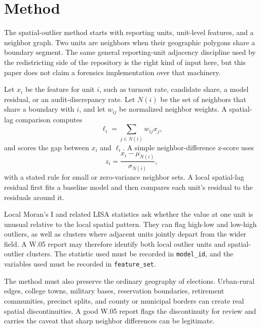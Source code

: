 \section{Method}

The spatial-outlier method starts with reporting units, unit-level features, and
a neighbor graph. Two units are neighbors when their geographic polygons share a
boundary segment. The same general reporting-unit adjacency discipline used by
the redistricting side of the repository is the right kind of input here, but
this paper does not claim a forensics implementation over that machinery.

Let $x_i$ be the feature for unit $i$, such as turnout rate, candidate share, a
model residual, or an audit-discrepancy rate. Let $N(i)$ be the set of neighbors
that share a boundary with $i$, and let $w_{ij}$ be normalized neighbor weights.
A spatial-lag comparison computes
\[
  \ell_i = \sum_{j \in N(i)} w_{ij} x_j,
\]
and scores the gap between $x_i$ and $\ell_i$. A simple neighbor-difference
z-score uses
\[
  z_i = \frac{x_i - \mu_{N(i)}}{\sigma_{N(i)}},
\]
with a stated rule for small or zero-variance neighbor sets. A local
spatial-lag residual first fits a baseline model and then compares each unit's
residual to the residuals around it.

Local Moran's I and related LISA statistics ask whether the value at one unit is
unusual relative to the local spatial pattern. They can flag high-low and
low-high outliers, as well as clusters where adjacent units jointly depart from
the wider field. A W.05 report may therefore identify both local outlier units
and spatial-outlier clusters. The statistic used must be recorded in
\texttt{model\_id}, and the variables used must be recorded in
\texttt{feature\_set}.

The method must also preserve the ordinary geography of elections. Urban-rural
edges, college towns, military bases, reservation boundaries, retirement
communities, precinct splits, and county or municipal borders can create real
spatial discontinuities. A good W.05 report flags the discontinuity for review
and carries the caveat that sharp neighbor differences can be legitimate.

